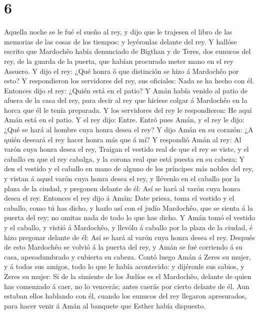 \hypertarget{section-5}{%
\section{6}\label{section-5}}

 Aquella noche se le fué el sueño al rey, y dijo que le
trajesen el libro de las memorias de las cosas de los tiempos: y
leyéronlas delante del rey.  Y hallóse escrito que Mardochêo
había denunciado de Bigthan y de Teres, dos eunucos del rey, de la
guarda de la puerta, que habían procurado meter mano en el rey Assuero.
 Y dijo el rey: ¿Qué honra ó que distinción se hizo á
Mardochêo por esto? Y respondieron los servidores del rey, sus
oficiales: Nada se ha hecho con él.  Entonces dijo el rey:
¿Quién está en el patio? Y Amán había venido al patio de afuera de la
casa del rey, para decir al rey que hiciese colgar á Mardochêo en la
horca que él le tenía preparada.  Y los servidores del rey
le respondieron: He aquí Amán está en el patio. Y el rey dijo: Entre.
 Entró pues Amán, y el rey le dijo: ¿Qué se hará al hombre
cuya honra desea el rey? Y dijo Amán en su corazón: ¿A quién deseará el
rey hacer honra más que á mí?  Y respondió Amán al rey: Al
varón cuya honra desea el rey,  Traigan el vestido real de
que el rey se viste, y el caballo en que el rey cabalga, y la corona
real que está puesta en su cabeza;  Y den el vestido y el
caballo en mano de alguno de los príncipes más nobles del rey, y vistan
á aquel varón cuya honra desea el rey, y llévenlo en el caballo por la
plaza de la ciudad, y pregonen delante de él: Así se hará al varón cuya
honra desea el rey.  Entonces el rey dijo á Amán: Date
priesa, toma el vestido y el caballo, como tú has dicho, y hazlo así con
el judío Mardochêo, que se sienta á la puerta del rey; no omitas nada de
todo lo que has dicho.  Y Amán tomó el vestido y el
caballo, y vistió á Mardochêo, y llevólo á caballo por la plaza de la
ciudad, é hizo pregonar delante de él: Así se hará al varón cuya honra
desea el rey.  Después de esto Mardochêo se volvió á la
puerta del rey, y Amán se fué corriendo á su casa, apesadumbrado y
cubierta su cabeza.  Contó luego Amán á Zeres su mujer, y á
todos sus amigos, todo lo que le había acontecido: y dijéronle sus
sabios, y Zeres su mujer: Si de la simiente de los Judíos es el
Mardochêo, delante de quien has comenzado á caer, no lo vencerás; antes
caerás por cierto delante de él.  Aun estaban ellos
hablando con él, cuando los eunucos del rey llegaron apresurados, para
hacer venir á Amán al banquete que Esther había dispuesto.

